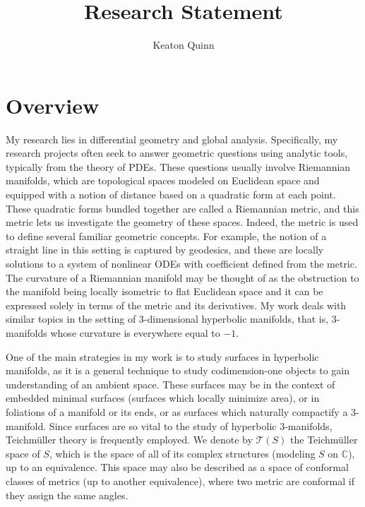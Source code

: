 \documentclass[11pt]{amsart}
\newcommand{\C}{\mathbb{C}}
\begin{document}
\title{Research Statement}

\author{Keaton Quinn}


\maketitle

\vspace{-0.2in}

\section{Overview}

My research lies in differential geometry and global analysis. 
Specifically, my research projects often seek to answer geometric questions using analytic tools, typically from the theory of PDEs. 
These questions usually involve Riemannian manifolds, which are topological spaces modeled on Euclidean space and equipped with a notion of distance based on a quadratic form at each point. 
These quadratic forms bundled together are called a Riemannian metric, and this metric lets us investigate the geometry of these spaces.  
Indeed, the metric is used to define several familiar geometric concepts. 
For example, the notion of a straight line in this setting is captured by geodesics, and these are locally solutions to a system of nonlinear ODEs with coefficient defined from the metric. 
The curvature of a Riemannian manifold may be thought of as the obstruction to the manifold being locally isometric to flat Euclidean space and it can be expressed solely in terms of the metric and its derivatives.  
My work deals with similar topics in the setting of 3-dimensional hyperbolic manifolds, that is, 3-manifolds whose curvature is everywhere equal to $-1$.


One of the main strategies in my work is to study surfaces in hyperbolic manifolds, as it is a general technique to study codimension-one objects to gain understanding of an ambient space. 
These surfaces may be in the context of embedded minimal surfaces (surfaces which locally minimize area), or in foliations of a manifold or its ends, or as surfaces which naturally compactify a 3-manifold. 
Since surfaces are so vital to the study of hyperbolic 3-manifolds, Teichm\"uller theory is frequently employed. 
We denote by $\mathcal{T}(S)$ the Teichm\"uller space of $S$, which is the space of all of its complex structures (modeling $S$ on $\C$), up to an equivalence. 
This space may also be described as a space of conformal classes of metrics (up to another equivalence), where two metric are conformal if they assign the same angles.
\end{document}
